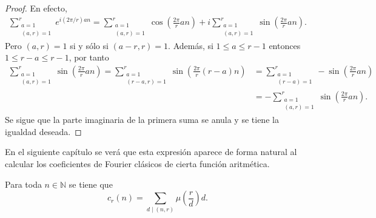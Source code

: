 \begin{proof}
En efecto,
\begin{align*}
    \sum_{\substack{a=1 \\ (a,r)=1}}^{r} e^{i(2 \pi / r) a n} = \sum_{\substack{a=1 \\ (a,r)=1}}^{r} \cos \left( \frac{2 \pi}{r} a n \right) + i \sum_{\substack{a=1 \\ (a,r)=1}}^{r} \sin \left( \frac{2 \pi}{r} a n \right).
\end{align*}
Pero $(a,r)=1$ si y sólo si $(a-r,r)=1$. Además, si $1 \le a \le r-1$ entonces $1 \le r-a \le r-1$, por tanto
\begin{align*}
    \sum_{\substack{a=1 \\ (a,r)=1}}^{r} \sin \left( \frac{2 \pi}{r} a n \right) = \sum_{\substack{a=1 \\ (r-a,r)=1}}^{r} \sin \left( \frac{2 \pi}{r} (r-a) n \right) & = \sum_{\substack{a=1 \\ (r-a)=1}}^{r} - \sin \left( \frac{2 \pi}{r} a n \right) \\
                                                                                 &= - \sum_{\substack{a=1 \\ (a,r)=1}}^{r} \sin \left( \frac{2 \pi}{r} a n \right).
\end{align*}
Se sigue que la parte imaginaria de la primera suma se anula y se tiene la igualdad deseada.
\end{proof}

En el siguiente capítulo se verá que esta expresión aparece de forma natural al calcular los coeficientes de Fourier clásicos de cierta función aritmética.

\begin{proposition}\label{prop:ram0}
Para toda $n \in \mathbb{N}$ se tiene que
\begin{equation*}
    c_r(n) = \sum_{d \mid (n,r)} \mu \left( \frac{r}{d} \right) d.
\end{equation*}
\end{proposition}

